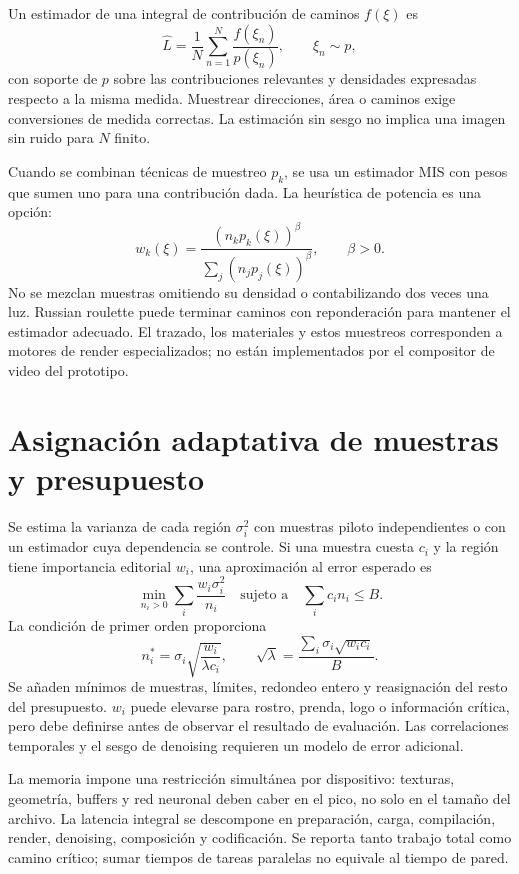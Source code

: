 Un estimador de una integral de contribución de caminos $f(\xi)$ es
\begin{equation}
 \widehat L=\frac1N\sum_{n=1}^N\frac{f(\xi_n)}{p(\xi_n)},\qquad\xi_n\sim p,
\end{equation}
con soporte de $p$ sobre las contribuciones relevantes y densidades expresadas respecto a la misma medida. Muestrear direcciones, área o caminos exige conversiones de medida correctas. La estimación sin sesgo no implica una imagen sin ruido para $N$ finito.

Cuando se combinan técnicas de muestreo $p_k$, se usa un estimador MIS con pesos que sumen uno para una contribución dada. La heurística de potencia es una opción:
\begin{equation}
 w_k(\xi)=\frac{(n_kp_k(\xi))^\beta}{\sum_j(n_jp_j(\xi))^\beta},\qquad\beta>0.
\end{equation}
No se mezclan muestras omitiendo su densidad o contabilizando dos veces una luz. Russian roulette puede terminar caminos con reponderación para mantener el estimador adecuado. El trazado, los materiales y estos muestreos corresponden a motores de render especializados; no están implementados por el compositor de video del prototipo.

\section{Asignación adaptativa de muestras y presupuesto}
Se estima la varianza de cada región $\sigma_i^2$ con muestras piloto independientes o con un estimador cuya dependencia se controle. Si una muestra cuesta $c_i$ y la región tiene importancia editorial $w_i$, una aproximación al error esperado es
\begin{equation}
 \min_{n_i>0}\sum_i\frac{w_i\sigma_i^2}{n_i}
 \quad\text{sujeto a}\quad\sum_ic_in_i\leq B.
\end{equation}
La condición de primer orden proporciona
\begin{equation}
 n_i^*=\sigma_i\sqrt{\frac{w_i}{\lambda c_i}},\qquad
 \sqrt\lambda=\frac{\sum_i\sigma_i\sqrt{w_ic_i}}{B}.
\end{equation}
Se añaden mínimos de muestras, límites, redondeo entero y reasignación del resto del presupuesto. $w_i$ puede elevarse para rostro, prenda, logo o información crítica, pero debe definirse antes de observar el resultado de evaluación. Las correlaciones temporales y el sesgo de denoising requieren un modelo de error adicional.

La memoria impone una restricción simultánea por dispositivo: texturas, geometría, buffers y red neuronal deben caber en el pico, no solo en el tamaño del archivo. La latencia integral se descompone en preparación, carga, compilación, render, denoising, composición y codificación. Se reporta tanto trabajo total como camino crítico; sumar tiempos de tareas paralelas no equivale al tiempo de pared.

